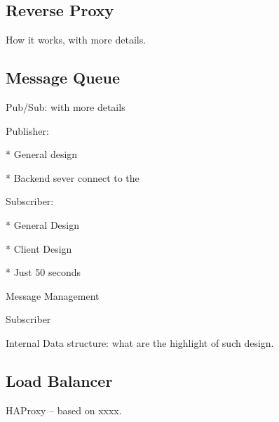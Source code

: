 \subsection{Reverse Proxy\\}

How it works, with more details.

\subsection{Message Queue\\}

Pub/Sub: with more details

Publisher: 

    * General design

    * Backend sever connect to the 

Subscriber: 

    * General Design

    * Client Design

    * Just 50 seconds

Message Management

Subscriber

Internal Data structure: what are the highlight of such design.

\subsection{Load Balancer\\}

HAProxy -- based on xxxx.

